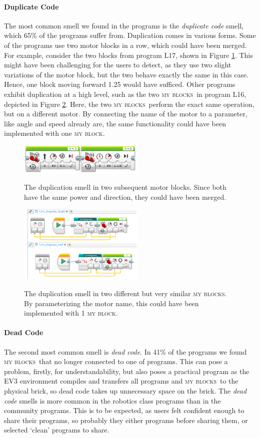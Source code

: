 \documentclass[conference]{IEEEtran}
\newcommand{\mbs}{\textsc{my blocks}}
\newcommand{\mb}{\textsc{my block}}
\begin{document}
\paragraph{Duplicate Code}
The most common smell we found in the programs is the \emph{duplicate code} smell, which 65\% of the programs suffer from. Duplication comes in various forms.  Some of the programs use two motor blocks in a row, which could have been merged. For example, consider the two blocks from program L17, shown in Figure \ref{fig:dup_ev3}. This might have been challenging for the users to detect, as they use two slight variations of the motor block, but the two behave exactly the same in this case. Hence, one block moving forward 1.25 would have sufficed. Other programs exhibit duplication at a high level, such as the two \mbs~in program L16, depicted in Figure \ref{fig:dup_ev3_myblocks}. Here, the two \mbs~perform the exact same operation, but on a different motor. By connecting the name of the motor to a parameter, like angle and speed already are, the same functionality could have been implemented with one \mb.

\begin{figure} [tb]
\caption{The duplication smell in two subsequent motor blocks. Since both have the same power and direction, they could have been merged. }
\centering
\includegraphics[width=6cm]{img/dup_ev3}
\label{fig:dup_ev3}
\end{figure}

\begin{figure} [tb]
\caption{The duplication smell in two different but very similar \mbs. By parameterizing the motor name, this could have been implemented with 1 \mb. }
\centering
\includegraphics[width=6cm]{img/dup_ev3_myblocks}
\label{fig:dup_ev3_myblocks}
\end{figure}

\paragraph{Dead Code}
The second most common smell is \emph{dead code}. In 41\% of the programs we found \mbs~that no longer connected to one of programs. This can pose a problem, firstly, for understandability, but also poses a practical program as the EV3 environment compiles and transfers all programs and \mbs~to the physical brick, so dead code takes up unnecessary space on the brick. The \emph{dead code} smells is more common in the robotics class programs than in the community programs. This is to be expected, as users felt confident enough to share their programs, so probably they either programs before sharing them, or selected `clean' programs to share.
\end{document}
